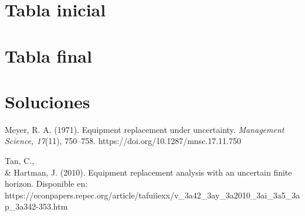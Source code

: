 \documentclass[12pt]{article}
\begin{document}
\bigskip
\section*{Tabla inicial}
\newpage
\section*{Tabla final}
\section*{Soluciones}
\begin{thebibliography}{9}
 Meyer, R. A. (1971). Equipment replacement under uncertainty. \textit{Management Science, 17}(11), 750--758. https://doi.org/10.1287/mnsc.17.11.750

 Tan, C., \\& Hartman, J. (2010). Equipment replacement analysis with an uncertain finite horizon. Disponible en: https://econpapers.repec.org/article/tafuiiexx/v\_3a42\_3ay\_3a2010\_3ai\_3a5\_3ap\_3a342-353.htm

\end{thebibliography}
\end{document}
